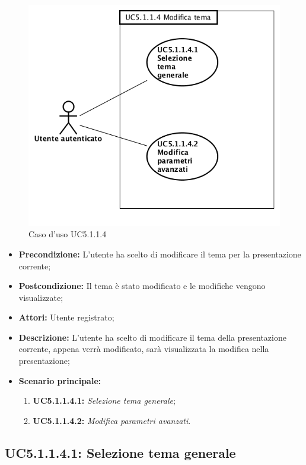 \begin{figure}[h]
	\begin{center}
	\includegraphics[scale=0.6]{diagram/UC5-1-1-4.png}
	\caption{Caso d'uso UC5.1.1.4}
	\end{center}
\end{figure}
\begin{itemize}
	\item \textbf{Precondizione:} L’utente ha scelto di modificare il tema per la presentazione corrente;
	\item \textbf{Postcondizione:} Il tema è stato modificato e le modifiche vengono visualizzate;
	\item \textbf{Attori:} Utente registrato;
	\item \textbf{Descrizione:} L'utente ha scelto di modificare il tema della presentazione corrente, appena verrà modificato, sarà visualizzata la modifica nella presentazione;
	\item \textbf{Scenario principale:}
	\begin{enumerate}
		\item \textbf{ UC5.1.1.4.1:} \textit{ Selezione tema generale};
		\item \textbf{ UC5.1.1.4.2:} \textit{ Modifica parametri avanzati}.
	\end{enumerate}
\end{itemize}
\subsection{ UC5.1.1.4.1: Selezione tema generale}

